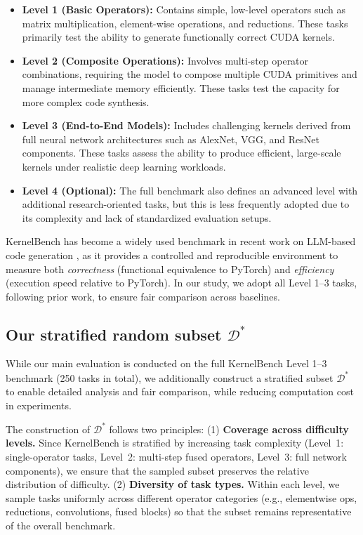 \begin{itemize}
\item \textbf{Level 1 (Basic Operators):} Contains simple, low-level operators such as matrix multiplication, element-wise operations, and reductions. These tasks primarily test the ability to generate functionally correct CUDA kernels.
\item \textbf{Level 2 (Composite Operations):} Involves multi-step operator combinations, requiring the model to compose multiple CUDA primitives and manage intermediate memory efficiently. These tasks test the capacity for more complex code synthesis.
\item \textbf{Level 3 (End-to-End Models):} Includes challenging kernels derived from full neural network architectures such as AlexNet, VGG, and ResNet components. These tasks assess the ability to produce efficient, large-scale kernels under realistic deep learning workloads.
\item \textbf{Level 4 (Optional):} The full benchmark also defines an advanced level with additional research-oriented tasks, but this is less frequently adopted due to its complexity and lack of standardized evaluation setups.
\end{itemize}

KernelBench has become a widely used benchmark in recent work on LLM-based code generation \citep{deepreinforce2025cudal1, kevin-multi-turn-rl, lange2025robustagenticcudakernel}, as it provides a controlled and reproducible environment to measure both \emph{correctness} (functional equivalence to PyTorch) and \emph{efficiency} (execution speed relative to PyTorch).
In our study, we adopt all Level 1–3 tasks, following prior work, to ensure fair comparison across baselines.



\subsection{Our stratified random subset \(\mathcal{D}^{*}\)}
\label{subset}
While our main evaluation is conducted on the full KernelBench Level 1–3 benchmark 
(250 tasks in total), we additionally construct a stratified subset $\mathcal{D}^{*}$ 
to enable detailed analysis and fair comparison, while reducing computation cost in experiments.  

The construction of $\mathcal{D}^{*}$ follows two principles:  
(1) \textbf{Coverage across difficulty levels.} Since KernelBench is stratified by 
increasing task complexity (Level~1: single-operator tasks, Level~2: multi-step fused operators, 
Level~3: full network components), we ensure that the sampled subset preserves the relative 
distribution of difficulty.  
(2) \textbf{Diversity of task types.} Within each level, we sample tasks uniformly across different 
operator categories (e.g., elementwise ops, reductions, convolutions, fused blocks) so that the 
subset remains representative of the overall benchmark.  

